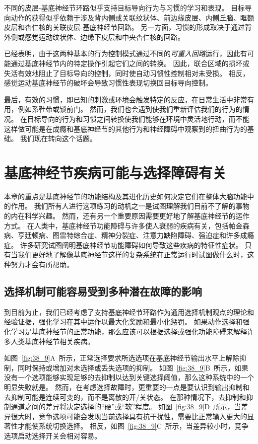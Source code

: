 不同的皮层-基底神经节环路似乎支持目标导向行为与习惯的学习和表现。
目标导向动作的获得似乎依赖于涉及背内侧或关联纹状体、前边缘皮层、内侧丘脑、眶额皮层和杏仁核的关联皮层-基底神经节回路。
另一方面，习惯的形成取决于通过背外侧或感觉运动纹状体、边缘下皮层和中央杏仁核的回路。


已经表明，由于这两种基本的行为控制模式通过不同的\textit{可重入回路}运行，因此有可能通过基底神经节内的特定操作引起它们之间的转换。
因此，联合区域的损坏或失活有效地阻止了目标导向的控制，同时使自动习惯性控制相对未受损。
相反，感觉运动基底神经节的破坏会导致习惯性表现切换回目标导向控制。


最后，有效的习惯，即已知的刺激或环境会触发特定的反应，在日常生活中非常有用，例如系鞋带或锁前门。
然而，我们也会遇到使我们重新评估我们的行为的情况。
在目标导向的行为和习惯之间转换使我们能够在环境中灵活地行动，而不能这样做可能是在成瘾和基底神经节的其他行为和神经障碍中观察到的扭曲行为的基础。
我们现在转向这个话题。



\section{基底神经节疾病可能与选择障碍有关}

本章的重点是基底神经节的功能结构及其进化历史如何决定它们在整体大脑功能中的作用。
我们所有人进行这项练习的动机之一是试图理解我们目前不了解的事物的内在科学兴趣。
然而，还有另一个重要原因需要更好地了解基底神经节的运作方式。
在人类中，基底神经节功能障碍与许多使人衰弱的疾病有关，包括帕金森病、亨廷顿病、图雷特综合症、精神分裂症、注意力缺陷障碍、强迫症和许多成瘾症。
许多研究试图阐明基底神经节功能障碍如何导致这些疾病的特征性症状。
只有当我们更好地了解像基底神经节这样的复杂系统在正常运行时试图做什么时，这种努力才会有所帮助。



\subsection{选择机制可能容易受到多种潜在故障的影响}

到目前为止，我们已经考虑了支持基底神经节环路作为通用选择机制观点的理论和经验证据，强化学习在其中运作以最大化奖励和最小化惩罚。
如果动作选择和强化学习是基底神经节的正常功能，那么应该可以根据选择或强化功能障碍来解释许多人类基底神经节相关疾病。


如图~\ref{fig:38_9}A~所示，正常选择要求所选选项在基底神经节输出水平上解除抑制，同时保持或增加对未选择或丢失选项的抑制。
如图~\ref{fig:38_9}B~所示，如果没有一个选项能够实现足够的去抑制以达到关键选择阈值，那么这种系统中的一个明显失败就是。
然而，在考虑选择故障时，更重要的一点是要认识到输出抑制和去抑制可能是连续可变的，而不是离散的开/关状态。
在那种情况下，去抑制和抑制通道之间的差异将决定选择的“硬”或“软”程度。
如图~\ref{fig:38_9}D~所示，当差异很大时，竞争选项可能会发现当前选择具有抗干扰性，需要比正常输入更大的显著性才能使系统切换选择。
相反，如图~\ref{fig:38_9}C~所示，当差异较小时，竞争选项启动选择开关会相对容易。


